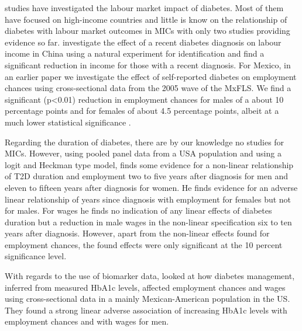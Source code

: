 studies have investigated the labour market impact of diabetes. Most
of them have focused on high-income countries and little is know on
the relationship of diabetes with labour market outcomes in \ac{MICs}
with only two studies providing evidence so far. \citet{Liu2014}
investigate the effect of a recent diabetes diagnosis on labour income
in China using a natural experiment for identification and find a
significant reduction in income for those with a recent diagnosis.
For Mexico, in an earlier paper we investigate the effect of self-reported
diabetes on employment chances using cross-sectional data from the
2005 wave of the \ac{MxFLS}. We find a significant (p<0.01) reduction
in employment chances for males of a about 10 percentage points and
for females of about 4.5 percentage points, albeit at a much lower
statistical significance \citep{Seuring2015}.

Regarding the duration of diabetes, there are by our knowledge no
studies for \ac{MICs}. However, using pooled panel data from a
\ac{USA} population and using a logit and Heckman type model, \citet{Minor2013}
finds some evidence for a non-linear relationship of \ac{T2D} duration
and employment two to five years after diagnosis for men and eleven
to fifteen years after diagnosis for women. He finds evidence for
an adverse linear relationship of years since diagnosis with employment
for females but not for males. For wages he finds no indication of
any linear effects of diabetes duration but a reduction in male wages
in the non-linear specification six to ten years after diagnosis.
However, apart from the non-linear effects found for employment chances,
the found effects were only significant at the 10 percent significance
level.

With regards to the use of biomarker data,\citet{BrownIII2011} looked
at how diabetes management, inferred from measured \ac{HbA1c} levels,
affected employment chances and wages using cross-sectional data in
a mainly Mexican-American population in the US. They found a strong
linear adverse association of increasing \ac{HbA1c} levels with
employment chances and with wages for men.

